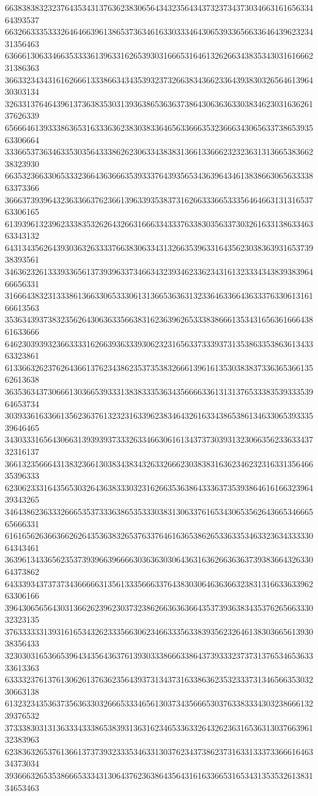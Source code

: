 66383838323237643534313763623830656434323564343732373437303466316165633464393537
66326633353332646466396138653736346163303334643065393365663364643962323431356463
63666130633466353333613963316265393031666531646132626634383534303161666231386363
36633234343161626661333866343435393237326638343662336439383032656461396430303134
32633137646439613736383530313936386536363738643063636330383462303163626137626339
65666461393338636531633363623830383364656336663532366634306563373865393563306664
33366537363463353035643338626230633438383136613366623232363131366538366238323930
66353236633065333236643636663539333764393565343639643461383866306563333863373366
36663739396432363366376236613963393538373162663336653335646466313131653763306165
61393961323962333835326264326631666334333763383035633730326163313863346363343132
64313435626439303632633337663830633431326635396331643562303836393165373938393561
34636232613339336561373939633734663432393462336234316132333434383938396466656331
31666438323133386136633065333061313665363631323364633664363337633061316166613563
35363439373832356264306363356638316236396265333838666135343165636166643861633666
64623039393236633331626639363339306232316563373339373135386335386361343363323861
61336632623762643661376234386235373538326661396161353038383733636536613562613638
36353634373066613036653933313838333536343566663361313137653338353933353964653734
30393361633661356236376132323163396238346432616334386538613463306539333539646465
34303331656430663139393937333263346630616134373730393132306635623363343732316137
36613235666431383236613038343834326332666230383831636234623231633135646635396333
62306233316435653032643638333032316266353638643336373539386461616632396439343265
34643862363332666535373336386535333038313063376165343065356264366534666565666331
61616562636636626264353638326537633764616365386265336335346332363433333064343461
36396134336562353739396639666630363630306436316362663636373938366432633064373862
64333934373737343666663135613335666337643830306463636632383131663363396263306166
39643065656430313662623962303732386266363636643537393638343537626566333032323135
37633333313931616534326233356630623466333563383935623264613830366561393038356433
32303031653665396434356436376139303338666338643739333237373137653465363333613363
63333237613761306261376362356439373134373163386362353233373134656635303230663138
61323234353637356363303266653334656130373435666530376338333430323866613239376532
37333830313136333433386538393136316234653363326432623631653631303766396132383963
62383632653761366137373932333534633130376234373862373163313337336661646334373034
39366632653538666533343130643762363864356431616336653165343135353261383134653463
